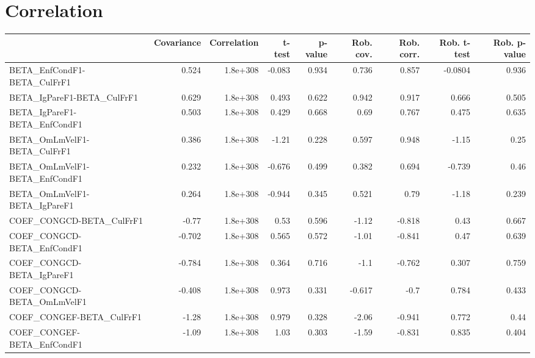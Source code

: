 \section{Correlation}
\begin{tabular}{lrrrrrrrr}
\toprule
{} &  Covariance &  Correlation &  t-test &  p-value &  Rob. cov. &  Rob. corr. &  Rob. t-test &  Rob. p-value \\
\midrule
BETA\_EnfCondF1-BETA\_CulFrF1           &       0.524 &     1.8e+308 &  -0.083 &    0.934 &      0.736 &       0.857 &      -0.0804 &         0.936 \\
BETA\_IgPareF1-BETA\_CulFrF1            &       0.629 &     1.8e+308 &   0.493 &    0.622 &      0.942 &       0.917 &        0.666 &         0.505 \\
BETA\_IgPareF1-BETA\_EnfCondF1          &       0.503 &     1.8e+308 &   0.429 &    0.668 &       0.69 &       0.767 &        0.475 &         0.635 \\
BETA\_OmLmVelF1-BETA\_CulFrF1           &       0.386 &     1.8e+308 &   -1.21 &    0.228 &      0.597 &       0.948 &        -1.15 &          0.25 \\
BETA\_OmLmVelF1-BETA\_EnfCondF1         &       0.232 &     1.8e+308 &  -0.676 &    0.499 &      0.382 &       0.694 &       -0.739 &          0.46 \\
BETA\_OmLmVelF1-BETA\_IgPareF1          &       0.264 &     1.8e+308 &  -0.944 &    0.345 &      0.521 &        0.79 &        -1.18 &         0.239 \\
COEF\_CONGCD-BETA\_CulFrF1              &       -0.77 &     1.8e+308 &    0.53 &    0.596 &      -1.12 &      -0.818 &         0.43 &         0.667 \\
COEF\_CONGCD-BETA\_EnfCondF1            &      -0.702 &     1.8e+308 &   0.565 &    0.572 &      -1.01 &      -0.841 &         0.47 &         0.639 \\
COEF\_CONGCD-BETA\_IgPareF1             &      -0.784 &     1.8e+308 &   0.364 &    0.716 &       -1.1 &      -0.762 &        0.307 &         0.759 \\
COEF\_CONGCD-BETA\_OmLmVelF1            &      -0.408 &     1.8e+308 &   0.973 &    0.331 &     -0.617 &        -0.7 &        0.784 &         0.433 \\
COEF\_CONGEF-BETA\_CulFrF1              &       -1.28 &     1.8e+308 &   0.979 &    0.328 &      -2.06 &      -0.941 &        0.772 &          0.44 \\
COEF\_CONGEF-BETA\_EnfCondF1            &       -1.09 &     1.8e+308 &    1.03 &    0.303 &      -1.59 &      -0.831 &        0.835 &         0.404 \\

\end{tabular}
